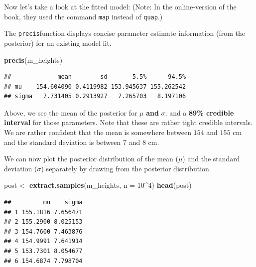 \documentclass[
]{book}
\newenvironment{Shaded}{\begin{snugshade}}{\end{snugshade}}
\newcommand{\AttributeTok}[1]{\textcolor[rgb]{0.13,0.29,0.53}{#1}}
\newcommand{\DecValTok}[1]{\textcolor[rgb]{0.00,0.00,0.81}{#1}}
\newcommand{\FunctionTok}[1]{\textcolor[rgb]{0.13,0.29,0.53}{\textbf{#1}}}
\newcommand{\NormalTok}[1]{#1}
\newcommand{\OtherTok}[1]{\textcolor[rgb]{0.56,0.35,0.01}{#1}}
\newcommand{\SpecialCharTok}[1]{\textcolor[rgb]{0.81,0.36,0.00}{\textbf{#1}}}
\begin{document}
Now let's take a look at the fitted model:
(Note: In the online-version of the book, they used the command \texttt{map} instead of \texttt{quap}.)

The \texttt{precis}function displays concise parameter estimate information
(from the posterior) for an existing model fit.

\begin{Shaded}
\begin{Highlighting}[]
\FunctionTok{precis}\NormalTok{(m\_heights)}
\end{Highlighting}
\end{Shaded}

\begin{verbatim}
##             mean        sd       5.5%      94.5%
## mu    154.604090 0.4119982 153.945637 155.262542
## sigma   7.731405 0.2913927   7.265703   8.197106
\end{verbatim}

Above, we see the mean of the posterior for \(\mu\) \textbf{and} \(\sigma\);
and a \textbf{89\% credible interval} for those parameters.
Note that these are rather tight credible intervals. We are rather confident that the mean is somewhere between
\(154\) and \(155\) cm and the standard deviation is between \(7\) and \(8\) cm.

We can now plot the posterior distribution of the mean (\(\mu\)) and the standard
deviation (\(\sigma\)) separately by drawing from the posterior distribution.

\begin{Shaded}
\begin{Highlighting}[]
\NormalTok{post }\OtherTok{\textless{}{-}} \FunctionTok{extract.samples}\NormalTok{(m\_heights, }\AttributeTok{n =} \DecValTok{10}\SpecialCharTok{\^{}}\DecValTok{4}\NormalTok{)}
\FunctionTok{head}\NormalTok{(post)}
\end{Highlighting}
\end{Shaded}

\begin{verbatim}
##         mu    sigma
## 1 155.1816 7.656471
## 2 155.2900 8.025153
## 3 154.7600 7.463876
## 4 154.9991 7.641914
## 5 153.7301 8.054677
## 6 154.6874 7.798704
\end{verbatim}

\begin{Shaded}
\end{Shaded}
\end{document}
